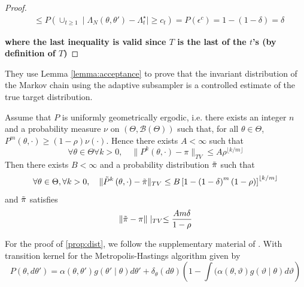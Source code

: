 {\begin{proof}
\begin{equation*}
\begin{split}
     & \leq P\left(\cup_{t \geq 1} \mid \Lambda_N\left(\theta, \theta'\right) - \Lambda_t^{\star}\mid \geq c_t \right) = P\left(\epsilon^c\right) = 1 - \left( 1 - \delta\right) = \delta 
\end{split}
\end{equation*}

\textbf{where the last inequality is valid since $T$ is the last of the $t$'s (by definition of $T$)}
\end{proof}
They use Lemma \ref{lemma:acceptance} to prove that the invariant distribution of the Markov chain using the adaptive subsampler is a controlled estimate of the true target distribution. 
\begin{proposition}\label{prop:dist}
Assume that $P$ is uniformly geometrically ergodic, i.e. there exists an integer $n$ and a probability measure $\nu$ on $\left(\Theta, \mathcal{B}\left(\Theta\right)\right)$ such that, for all $\theta \in \Theta$, $P^m\left(\theta, \cdot\right) \geq \left(1 - \rho\right)\nu\left(\cdot\right)$. Hence there exists $A < \infty$ such that
\begin{equation*}
    \forall \theta \in \Theta \forall k > 0, \quad \lVert P^k\left(\theta, \cdot\right) - \pi \rVert_{TV} \leq A\rho^{\lfloor k/m \rfloor} 
\end{equation*}
Then there exists $B < \infty$ and a probability distribution $\Tilde{\pi}$ such that 
\begin{equation*}
    \forall \theta \in \Theta, \forall k > 0, \quad \lVert \Tilde{P}^k\left(\theta, \cdot\right) - \Tilde{\pi}\rVert_{TV} \leq B\left[ 1 - \left(1- \delta\right)^m \left(1-\rho\right)\right]^{\lfloor k/m\rfloor}
\end{equation*}
and $\Tilde{\pi}$ satisfies 
\begin{equation*}
    \lVert \Tilde{\pi} - \pi \rVert \mid_{TV} \leq \frac{A m\delta}{1-\rho} 
\end{equation*}
\end{proposition}
For the proof of \ref{prop:dist}, we follow the supplementary material of \cite{Bardenet:2}. 
With transition kernel for the Metropolis-Hastings algorithm given by 
\begin{equation*}
    P\left(\theta, d\theta'\right) = \alpha\left(\theta, \theta'\right)g\left(\theta'\mid \theta\right)d\theta' + \delta_{\theta}\left(d\theta\right)\left(1 - \int(\alpha\left(\theta, \vartheta\right)g\left(\vartheta\mid\theta\right) d\vartheta  \right) 
\end{equation*}
}
